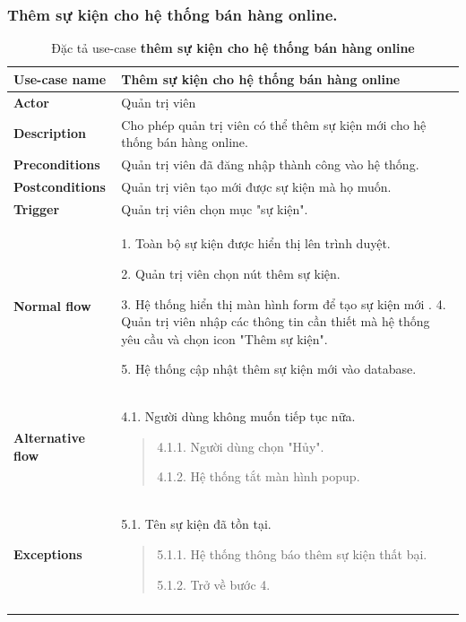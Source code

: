 \subsubsection{Thêm sự kiện cho hệ thống bán hàng online.}
{
\setlength\extrarowheight{6pt}
\begin{longtable}{| p{} | p{} |} 
\hline
\textbf{Use-case name} 
& 
Thêm sự kiện cho hệ thống bán hàng online
\\
\hline
\textbf{Actor} 
& 
Quản trị viên
\\
\hline
\textbf{Description} 
& 
Cho phép quản trị viên có thể thêm sự kiện mới cho hệ thống bán hàng online.
\\
\hline
\textbf{Preconditions} 
&
Quản trị viên đã đăng nhập thành công vào hệ thống.
\\
\hline
\textbf{Postconditions} 
& 
Quản trị viên tạo mới được sự kiện mà họ muốn.
\\
\hline
\textbf{Trigger} 
& 
Quản trị viên chọn mục "sự kiện".
\\
\hline
\begin{flushleft}
\textbf{Normal flow}
\end{flushleft}
& 
    1. Toàn bộ sự kiện được hiển thị lên trình duyệt.
    
    2. Quản trị viên chọn nút thêm sự kiện.
    
    3. Hệ thống hiển thị màn hình form để tạo sự kiện mới
    .
    4. Quản trị viên nhập các thông tin cần thiết mà hệ thống yêu cầu và chọn icon "Thêm sự kiện".
    
    5. Hệ thống cập nhật thêm sự kiện mới vào database.
\\
\hline
\begin{flushleft}
\textbf{Alternative flow}
\end{flushleft}
& 
4.1. Người dùng không muốn tiếp tục nữa.
    \begin{quote}
        4.1.1. Người dùng chọn "Hủy".
        
        4.1.2. Hệ thống tắt màn hình popup.
    \end{quote}
\\
\hline
\begin{flushleft}
\textbf{Exceptions} 
\end{flushleft}
&
5.1. Tên sự kiện đã tồn tại.
    \begin{quote}
        5.1.1. Hệ thống thông báo thêm sự kiện thất bại.
        
    5.1.2. Trở về bước 4.
    \end{quote}

\\
\hline
\caption{Đặc tả use-case \textbf{thêm sự kiện cho hệ thống bán hàng online}}
\end{longtable}
}
            
